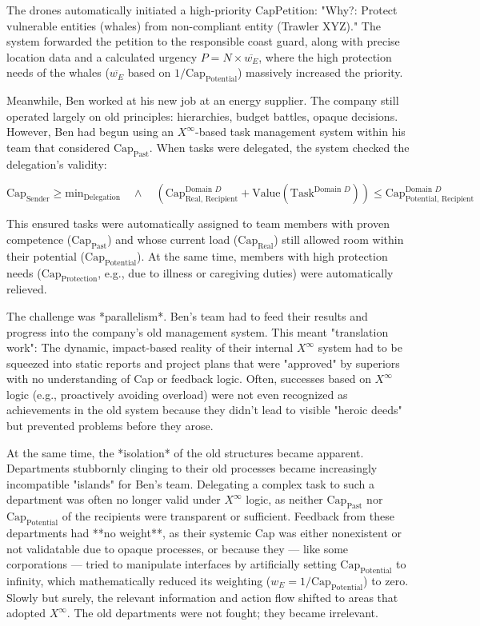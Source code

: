\documentclass[12pt, english, parskip=full]{scrartcl} %
\begin{document}
The drones automatically initiated a high-priority $\text{CapPetition}$: "Why?: Protect vulnerable entities (whales) from non-compliant entity (Trawler XYZ)." The system forwarded the petition to the responsible coast guard, along with precise location data and a calculated urgency $P = N \times \overline{w_E}$, where the high protection needs of the whales ($\overline{w_E}$ based on $1/\text{Cap}_{\text{Potential}}$) massively increased the priority.

Meanwhile, Ben worked at his new job at an energy supplier. The company still operated largely on old principles: hierarchies, budget battles, opaque decisions. However, Ben had begun using an $X^{\infty}$-based task management system within his team that considered $\text{Cap}_{\text{Past}}$. When tasks were delegated, the system checked the delegation’s validity:

$$ \text{Cap}_{\text{Sender}} \geq \text{min}_{\text{Delegation}} \quad \land \quad (\text{Cap}_{\text{Real, Recipient}}^{\text{Domain } D} + \text{Value}(\text{Task}^{\text{Domain } D})) \leq \text{Cap}_{\text{Potential, Recipient}}^{\text{Domain } D} $$

This ensured tasks were automatically assigned to team members with proven competence ($\text{Cap}_{\text{Past}}$) and whose current load ($\text{Cap}_{\text{Real}}$) still allowed room within their potential ($\text{Cap}_{\text{Potential}}$). At the same time, members with high protection needs ($\text{Cap}_{\text{Protection}}$, e.g., due to illness or caregiving duties) were automatically relieved.

The challenge was *parallelism*. Ben’s team had to feed their results and progress into the company’s old management system. This meant "translation work": The dynamic, impact-based reality of their internal $X^{\infty}$ system had to be squeezed into static reports and project plans that were "approved" by superiors with no understanding of Cap or feedback logic. Often, successes based on $X^{\infty}$ logic (e.g., proactively avoiding overload) were not even recognized as achievements in the old system because they didn’t lead to visible "heroic deeds" but prevented problems before they arose.

At the same time, the *isolation* of the old structures became apparent. Departments stubbornly clinging to their old processes became increasingly incompatible "islands" for Ben’s team. Delegating a complex task to such a department was often no longer valid under $X^{\infty}$ logic, as neither $\text{Cap}_{\text{Past}}$ nor $\text{Cap}_{\text{Potential}}$ of the recipients were transparent or sufficient. Feedback from these departments had **no weight**, as their systemic Cap was either nonexistent or not validatable due to opaque processes, or because they — like some corporations — tried to manipulate interfaces by artificially setting $\text{Cap}_{\text{Potential}}$ to infinity, which mathematically reduced its weighting ($w_E = 1/\text{Cap}_{\text{Potential}}$) to zero. Slowly but surely, the relevant information and action flow shifted to areas that adopted $X^{\infty}$. The old departments were not fought; they became irrelevant.
\end{document}
